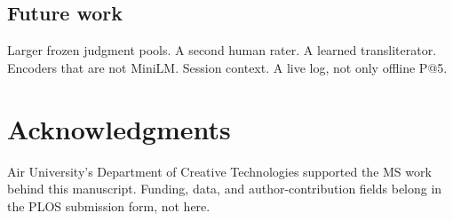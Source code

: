 \subsection*{Future work}
\label{sec:future_work}

Larger frozen judgment pools. A second human rater. A learned transliterator. Encoders that are not MiniLM. Session context. A live log, not only offline P@5.

\section*{Acknowledgments}

Air University's Department of Creative Technologies supported the MS work behind this manuscript. Funding, data, and author-contribution fields belong in the PLOS submission form, not here.

\nolinenumbers





